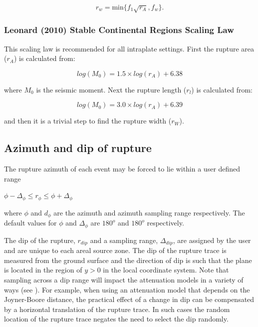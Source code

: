 \begin{equation}
r_w = \textrm{min$\{f_1\sqrt{r_A},f_w\}$}.
\end{equation}

\subsubsection{Leonard (2010) Stable Continental Regions Scaling Law}
This scaling law is recommended for all intraplate settings. First the rupture area ($r_A$) is calculated from:

\begin{equation}
log(M_{0}) = 1.5  \times log(r_A) + 6.38
\end{equation}

where $M_{0}$ is the seismic moment. Next the rupture length ($r_l$) is calculated from:

\begin{equation}
log(M_{0}) = 3.0  \times log(r_A) + 6.39
\end{equation}

and then it is a trivial step to find the rupture width ($r_W$).

\subsection{Azimuth and dip of rupture}
\label{sec:az-dip-rupture}

The rupture azimuth of each event may be forced to lie within a
user defined range
\begin{center} $\phi - \Delta_{\phi} \leq r_\phi \leq \phi + \Delta_{\phi}$ \end{center}
where $\phi$ and $d_{\phi}$ are the azimuth and azimuth sampling range respectively. The
default values for $\phi$ and $\Delta_{\phi}$ are $180^o$ and $180^o$
respectively. 

The dip of the rupture, $r_{dip}$ and a sampling range, $\Delta_{dip}$, are assigned by the 
user and are unique to each areal source zone. The dip of the rupture trace is measured from the
ground surface and the direction of dip is such that the plane is
located in the region of $y>0$ in the local coordinate system.
Note that sampling across a dip range will impact the attenuation models in a variety of ways (see ). 
For example, when using an attenuation model that depends 
on the Joyner-Boore distance, the practical effect of a change in dip can be compensated by a
horizontal translation of the rupture trace. In such cases the random
location of the rupture trace negates the need to select the dip randomly.

